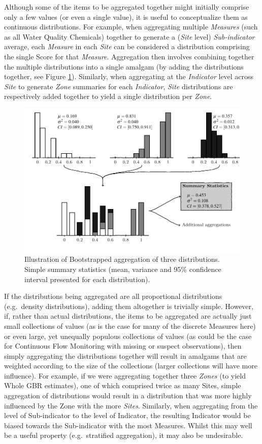 Although some of the items to be aggregated together might initially comprise only a few values (or
even a single value), it is useful to conceptualize them as continuous distributions. For example,
when aggregating multiple \emph{Measures} (such as all Water Quality Chemicals) together to generate
a (\emph{Site} level) \emph{Sub-indicator} average, each \emph{Measure} in each \emph{Site} can be
considered a distribution comprising the single Score for that \emph{Measure}. Aggregation then
involves combining together the multiple distributions into a single amalgam (by adding the
distributions together, see Figure \ref{fig:bootstrap}). Similarly, when aggregating at the
\emph{Indicator} level across \emph{Site} to generate \emph{Zone} summaries for each
\emph{Indicator}, \emph{Site} distributions are respectively added together to yield a single
distribution per \emph{Zone}.

\begin{figure}[h]
\centering
\includegraphics[width=0.7\linewidth]{figures/Diagrams/bootstrap.pdf}
\caption{Illustration of Bootstrapped aggregation of three distributions.  Simple summary statistics (mean, variance and 95\% confidence interval presented for each distribution).}\label{fig:bootstrap}
\end{figure}


If the distributions being aggregated are all proportional distributions (e.g.~density
distributions), adding them altogether is trivially simple. However, if, rather than actual
distributions, the items to be aggregated are actually just small collections of values (as is the
case for many of the discrete Measures here) or even large, yet unequally populous collections of
values (as could be the case for Continuous Flow Monitoring with missing or suspect observations),
then simply aggregating the distributions together will result in amalgams that are weighted
according to the size of the collections (larger collections will have more influence). For example,
if we were aggregating together three \emph{Zones} (to yield Whole GBR estimates), one of which
comprised twice as many Sites, simple aggregation of distributions would result in a distribution
that was more highly influenced by the Zone with the more \emph{Sites}. Similarly, when aggregating
from the level of Sub-indicator to the level of Indicator, the resulting Indicator would be biased
towards the Sub-indicator with the most Measures.  Whilst this may well be a useful property
(e.g.~stratified aggregation), it may also be undesirable.


